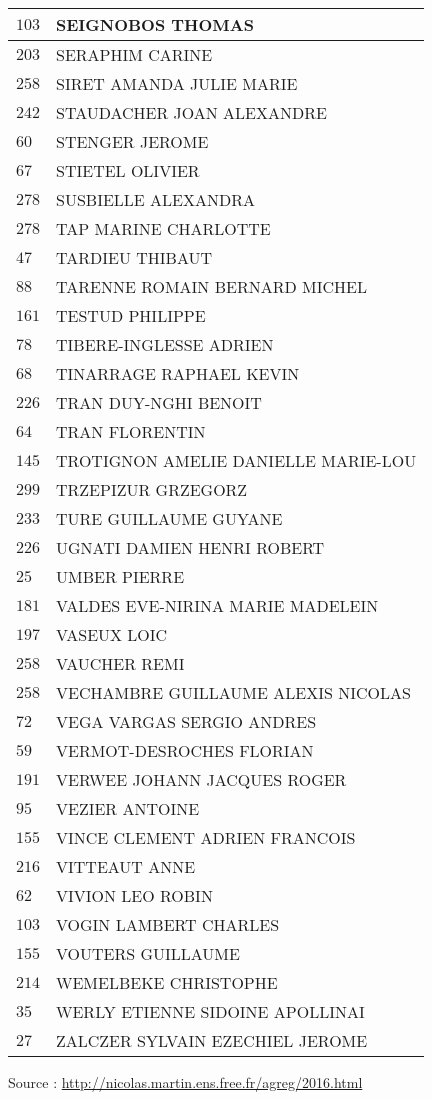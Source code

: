 \begin{xltabular}{\linewidth}{|l|X|}
    \hline
    $103$ & SEIGNOBOS THOMAS \\
    \hline
    $203$ & SERAPHIM CARINE \\
    \hline
    $258$ & SIRET AMANDA JULIE MARIE \\
    \hline
    $242$ & STAUDACHER JOAN ALEXANDRE \\
    \hline
    $60$ & STENGER JEROME \\
    \hline
    $67$ & STIETEL OLIVIER \\
    \hline
    $278$ & SUSBIELLE ALEXANDRA \\
    \hline
    $278$ & TAP MARINE CHARLOTTE \\
    \hline
    $47$ & TARDIEU THIBAUT \\
    \hline
    $88$ & TARENNE ROMAIN BERNARD MICHEL \\
    \hline
    $161$ & TESTUD PHILIPPE \\
    \hline
    $78$ & TIBERE-INGLESSE ADRIEN \\
    \hline
    $68$ & TINARRAGE RAPHAEL KEVIN \\
    \hline
    $226$ & TRAN DUY-NGHI BENOIT \\
    \hline
    $64$ & TRAN FLORENTIN \\
    \hline
    $145$ & TROTIGNON AMELIE DANIELLE MARIE-LOU \\
    \hline
    $299$ & TRZEPIZUR GRZEGORZ \\
    \hline
    $233$ & TURE GUILLAUME GUYANE \\
    \hline
    $226$ & UGNATI DAMIEN HENRI ROBERT \\
    \hline
    $25$ & UMBER PIERRE \\
    \hline
    $181$ & VALDES EVE-NIRINA MARIE MADELEIN \\
    \hline
    $197$ & VASEUX LOIC \\
    \hline
    $258$ & VAUCHER REMI \\
    \hline
    $258$ & VECHAMBRE GUILLAUME ALEXIS NICOLAS \\
    \hline
    $72$ & VEGA VARGAS SERGIO ANDRES \\
    \hline
    $59$ & VERMOT-DESROCHES FLORIAN \\
    \hline
    $191$ & VERWEE JOHANN JACQUES ROGER \\
    \hline
    $95$ & VEZIER ANTOINE \\
    \hline
    $155$ & VINCE CLEMENT ADRIEN FRANCOIS \\
    \hline
    $216$ & VITTEAUT ANNE \\
    \hline
    $62$ & VIVION LEO ROBIN \\
    \hline
    $103$ & VOGIN LAMBERT CHARLES \\
    \hline
    $155$ & VOUTERS GUILLAUME \\
    \hline
    $214$ & WEMELBEKE CHRISTOPHE \\
    \hline
    $35$ & WERLY ETIENNE SIDOINE APOLLINAI \\
    \hline
    $27$ & ZALCZER SYLVAIN EZECHIEL JEROME \\
    \hline
  \end{xltabular}

  \begin{flushright}
    {\tiny Source : \url{http://nicolas.martin.ens.free.fr/agreg/2016.html}}
  \end{flushright}

